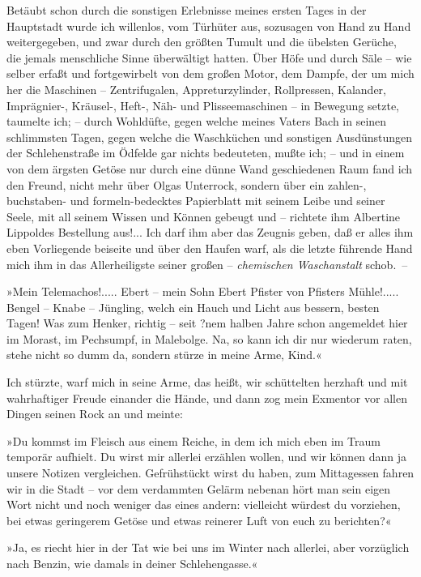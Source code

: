Betäubt schon durch die sonstigen Erlebnisse meines ersten Tages in
der Hauptstadt wurde ich willenlos, vom Türhüter aus, sozusagen von
Hand zu Hand weitergegeben, und zwar durch den größten Tumult und
die übelsten Gerüche, die jemals menschliche Sinne überwältigt
hatten. Über Höfe und durch Säle – wie selber erfaßt und
fortgewirbelt von dem großen Motor, dem Dampfe, der um mich her die
Maschinen – Zentrifugalen, Appreturzylinder, Rollpressen, Kalander,
Imprägnier-, Kräusel-, Heft-, Näh- und Plisseemaschinen – in
Bewegung setzte, taumelte ich; – durch Wohldüfte, gegen welche
meines Vaters Bach in seinen schlimmsten Tagen, gegen welche die
Waschküchen und sonstigen Ausdünstungen der Schlehenstraße im
Ödfelde gar nichts bedeuteten, mußte ich; – und in einem von dem
ärgsten Getöse nur durch eine dünne Wand geschiedenen Raum fand ich
den Freund, nicht mehr über Olgas Unterrock, sondern über ein
zahlen-, buchstaben- und formeln-bedecktes Papierblatt mit seinem
Leibe und seiner Seele, mit all seinem Wissen und Können gebeugt
und – richtete ihm Albertine Lippoldes Bestellung aus!... Ich darf
ihm aber das Zeugnis geben, daß er alles ihm eben Vorliegende
beiseite und über den Haufen warf, als die letzte führende Hand
mich ihm in das Allerheiligste seiner großen –
\emph{chemischen Waschanstalt} schob.~–

»Mein Telemachos!..... Ebert – mein Sohn Ebert Pfister von Pfisters
Mühle!..... Bengel – Knabe – Jüngling, welch ein Hauch und Licht
aus bessern, besten Tagen! Was zum Henker, richtig – seit ?nem
halben Jahre schon angemeldet hier im Morast, im Pechsumpf, in
Malebolge. Na, so kann ich dir nur wiederum raten, stehe nicht so
dumm da, sondern stürze in meine Arme, Kind.«

Ich stürzte, warf mich in seine Arme, das heißt, wir schüttelten
herzhaft und mit wahrhaftiger Freude einander die Hände, und dann
zog mein Exmentor vor allen Dingen seinen Rock an und meinte:

»Du kommst im Fleisch aus einem Reiche, in dem ich mich eben im
Traum temporär aufhielt. Du wirst mir allerlei erzählen wollen, und
wir können dann ja unsere Notizen vergleichen. Gefrühstückt wirst
du haben, zum Mittagessen fahren wir in die Stadt – vor dem
verdammten Gelärm nebenan hört man sein eigen Wort nicht und noch
weniger das eines andern: vielleicht würdest du vorziehen, bei
etwas geringerem Getöse und etwas reinerer Luft von euch zu
berichten?«

»Ja, es riecht hier in der Tat wie bei uns im Winter nach allerlei,
aber vorzüglich nach Benzin, wie damals in deiner Schlehengasse.«


